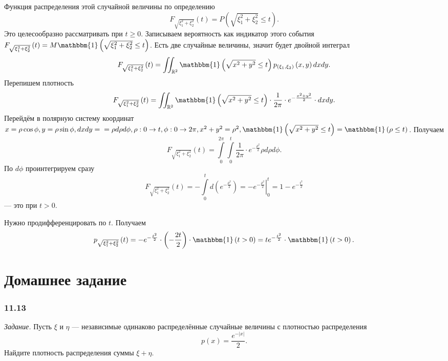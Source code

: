 Функция распределения этой случайной величины по определению
$$F_{ \sqrt{ \xi_1^2 + \xi_2^2}} \left( t \right) =
P \left( \sqrt{ \xi_1^2 + \xi_2^2} \leq t \right).$$
Это целесообразно рассматривать при $t \geq 0$.
Записываем вероятность как индикатор этого события $F_{ \sqrt{ \xi_1^2 + \xi_2^2}} \left( t \right) = M \mathbbm{1} \left( \sqrt{ \xi_1^2 + \xi_2^2} \leq t \right) $.
Есть две случайные величины, значит будет двойной интеграл
$$F_{ \sqrt{ \xi_1^2 + \xi_2^2}} \left( t \right) =
\iint_{ \mathbb{R}^2} \mathbbm{1} \left( \sqrt{x^2 + y^2} \leq t \right) p_{ \left( \xi_1, \xi_2 \right) } \left( x, y \right) dxdy.$$
Перепишем плотность
$$F_{ \sqrt{ \xi_1^2 + \xi_2^2}} \left( t \right) =
\iint_{ \mathbb{R}^2} \mathbbm{1} \left( \sqrt{x^2 + y^2} \leq t \right) \cdot \frac{1}{2 \pi } \cdot e^{- \frac{x^2 + y^2}{2}} \cdot dxdy.$$
Перейдём в полярную систему координат
$x = \rho \cos \phi,
y = \rho \sin \phi,
dxdy = \\
= \rho d \rho d \phi,
\rho: 0 \rightarrow t,
\phi: 0 \rightarrow 2 \pi,
x^2 + y^2 = \rho^2,
\mathbbm{1} \left( \sqrt{x^2 + y^2} \leq t \right) = \mathbbm{1} \left( \rho \leq t \right) $.
Получаем
$$F_{ \sqrt{ \xi_1^2 + \xi_2^2}} \left( t \right) =
\int \limits_0^{2 \pi } \int \limits_0^t \frac{1}{2 \pi } \cdot e^{- \frac{ \rho^2}{2}} \rho d \rho d \phi.$$
По $d \phi $ проинтегрируем сразу
$$F_{ \sqrt{ \xi_1^2 + \xi_2^2}} \left( t \right) =
- \int \limits_0^t d \left( e^{- \frac{ \rho^2}{2}} \right) =
\left. - e^{- \frac{ \rho^2}{2}} \right|_0^t =
1 - e^{- \frac{t^2}{2}}$$
--- это при $t > 0$.

Нужно продифференцировать по $t$.
Получаем
$$p_{ \sqrt{ \xi_1^2 + \xi_2^2}} \left( t \right) =
- e^{- \frac{t^2}{2}} \cdot \left( - \frac{2t}{2} \right) \cdot \mathbbm{1} \left( t > 0 \right) =
te^{- \frac{t^2}{2}} \cdot \mathbbm{1} \left( t > 0 \right).$$

\section*{Домашнее задание}

\subsubsection*{11.13}

\textit{Задание.} Пусть $ \xi $ и $ \eta $ --- независимые одинаково распределённые случайные величины с плотностью распределения
$$p \left( x \right) =
\frac{e^{- \left| x \right| }}{2}.$$
Найдите плотность распределения суммы $ \xi + \eta $.

